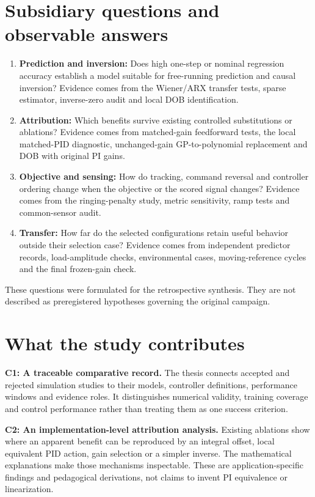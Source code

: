 \section{Subsidiary questions and observable answers}
\begin{enumerate}[label=\textbf{RQ\arabic*.},leftmargin=*]
\item \textbf{Prediction and inversion:} Does high one-step or nominal regression accuracy establish a model suitable for free-running prediction and causal inversion? Evidence comes from the Wiener/ARX transfer tests, sparse estimator, inverse-zero audit and local DOB identification.
\item \textbf{Attribution:} Which benefits survive existing controlled substitutions or ablations? Evidence comes from matched-gain feedforward tests, the local matched-PID diagnostic, unchanged-gain GP-to-polynomial replacement and DOB with original PI gains.
\item \textbf{Objective and sensing:} How do tracking, command reversal and controller ordering change when the objective or the scored signal changes? Evidence comes from the ringing-penalty study, metric sensitivity, ramp tests and common-sensor audit.
\item \textbf{Transfer:} How far do the selected configurations retain useful behavior outside their selection case? Evidence comes from independent predictor records, load-amplitude checks, environmental cases, moving-reference cycles and the final frozen-gain check.
\end{enumerate}
These questions were formulated for the retrospective synthesis. They are not described as preregistered hypotheses governing the original campaign.

\section{What the study contributes}
\textbf{C1: A traceable comparative record.} The thesis connects accepted and rejected simulation studies to their models, controller definitions, performance windows and evidence roles. It distinguishes numerical validity, training coverage and control performance rather than treating them as one success criterion.

\textbf{C2: An implementation-level attribution analysis.} Existing ablations show where an apparent benefit can be reproduced by an integral offset, local equivalent PID action, gain selection or a simpler inverse. The mathematical explanations make those mechanisms inspectable. These are application-specific findings and pedagogical derivations, not claims to invent PI equivalence or linearization.

